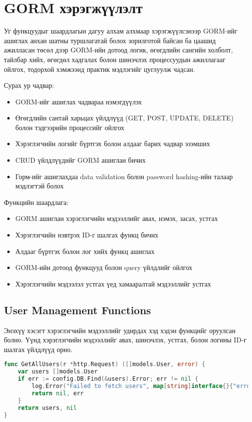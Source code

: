 \section{GORM хэрэгжүүлэлт}

Уг функцуудыг шаардлагын дагуу алхам алхмаар хэрэгжүүлсэнээр GORM-ийг ашиглах анхан шатны туршлагатай болох зорилготой байсан ба цаашид ажилласан төсөл дээр GORM-ийн дотоод логик, өгөгдлийн сангийн холболт, тайлбар хийх, өгөгдөл хадгалах болон шинэчлэх процессуудын ажиллагааг ойлгох, тодорхой хэмжээнд практик мэдлэгийг цуглуулж чадсан.

Сурах ур чадвар: 
\begin{itemize} \item GORM-ийг ашиглах чадвараа нэмэгдүүлэх 
	\item Өгөгдлийн сантай харьцах үйлдлүүд (GET, POST, UPDATE, DELETE) болон тэдгээрийн процессийг ойлгох 
	\item Хэрэглэгчийн логийг бүртгэх болон алдааг барих чадвар эзэмших 
	\item CRUD үйлдлүүдийг GORM ашиглан бичих 
	\item Горм-ийг ашиглахдаа data validation болон password hashing-ийн талаар мэдлэгтэй болох \end{itemize}

Функцийн шаардлага: 
\begin{itemize} 
	\item GORM ашиглан хэрэглэгчийн мэдээллийг авах, нэмэх, засах, устгах 
	\item Хэрэглэгчийн нэвтрэх ID-г шалгах функц бичих 
	\item Алдааг бүртгэх болон лог хийх функц ашиглах 
	\item GORM-ийн дотоод функцууд болон query үйлдлийг ойлгох 
	\item Хэрэглэгчийн мэдээлэл устгах үед хамааралтай мэдээллийг устгах
\end{itemize}
	
\subsection{User Management Functions}

Энэхүү хэсэгт хэрэглэгчийн мэдээллийг удирдах хэд хэдэн функцийг оруулсан болно. Үүнд хэрэглэгчийн мэдээллийг авах, шинэчлэх, устгах, болон логины ID-г шалгах үйлдлүүд орно.

\begin{lstlisting}[language=Go, caption=Get all users function, frame=single]
func GetAllUsers(r *http.Request) ([]models.User, error) {
	var users []models.User
	if err := config.DB.Find(&users).Error; err != nil {
		log.Error("Failed to fetch users", map[string]interface{}{"error": err.Error()}, r)
		return nil, err
	}
	return users, nil
}
\end{lstlisting}

